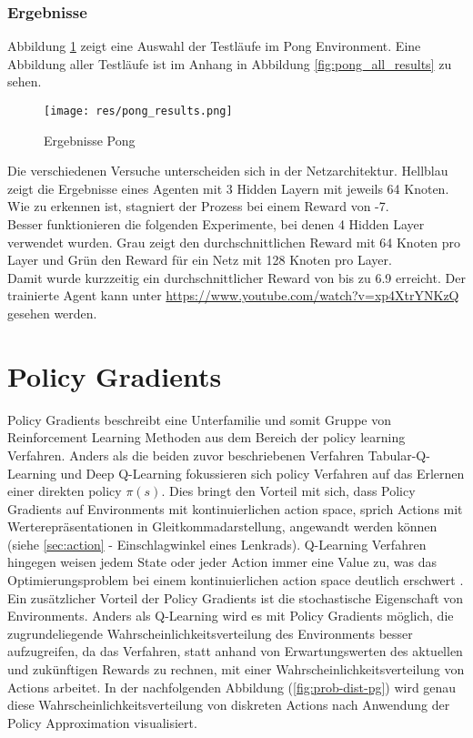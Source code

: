 \documentclass[11pt]{scrartcl}
\begin{document}
\subsubsection{Ergebnisse}
Abbildung \ref{fig:pong_results} zeigt eine Auswahl der Testläufe im Pong Environment.
Eine Abbildung aller Testläufe ist im Anhang in Abbildung \ref{fig:pong_all_results} zu
sehen.

\begin{figure}[htp]
\centering
\texttt{[image: res/pong\_results.png]}
\caption{Ergebnisse Pong}
\label{fig:pong_results}
\end{figure}
\noindent
Die verschiedenen Versuche unterscheiden sich in der Netzarchitektur. Hellblau zeigt die
Ergebnisse eines Agenten mit 3 Hidden Layern mit jeweils 64 Knoten. Wie zu erkennen ist,
stagniert der Prozess bei einem Reward von -7.\\
Besser funktionieren die folgenden Experimente, bei denen 4 Hidden Layer verwendet wurden.
Grau zeigt den durchschnittlichen Reward mit 64 Knoten pro Layer und Grün den Reward für
ein Netz mit 128 Knoten pro Layer.\\
Damit wurde kurzzeitig ein durchschnittlicher Reward von bis zu 6.9 erreicht. Der
trainierte Agent kann unter \url{https://www.youtube.com/watch?v=xp4XtrYNKzQ} gesehen
werden.

\newpage
\section{Policy Gradients}
Policy Gradients beschreibt eine Unterfamilie und somit Gruppe von Reinforcement Learning 
Methoden aus dem Bereich der policy learning Verfahren. Anders als die beiden zuvor
beschriebenen Verfahren Tabular-Q-Learning und Deep Q-Learning fokussieren sich policy
Verfahren auf das Erlernen einer direkten policy $\pi(s)$. Dies bringt den Vorteil mit sich,
dass Policy Gradients auf Environments mit kontinuierlichen action space, sprich Actions mit
Werterepräsentationen in Gleitkommadarstellung, angewandt werden können (siehe
\ref{sec:action}  - Einschlagwinkel eines Lenkrads). Q-Learning Verfahren
hingegen weisen jedem State oder jeder Action immer eine Value zu, was das Optimierungsproblem
bei einem kontinuierlichen action space deutlich erschwert \cite[~S.242]{L2018}. Ein
zusätzlicher Vorteil der Policy Gradients ist die stochastische Eigenschaft von Environments.
Anders als Q-Learning wird es mit Policy Gradients möglich, die zugrundeliegende
Wahrscheinlichkeitsverteilung des Environments besser aufzugreifen, da das Verfahren, statt
anhand von Erwartungswerten des aktuellen und zukünftigen Rewards zu rechnen, mit einer
Wahrscheinlichkeitsverteilung von Actions arbeitet. In der nachfolgenden Abbildung 
(\ref{fig:prob-dist-pg}) wird genau diese Wahrscheinlichkeitsverteilung von diskreten Actions
nach Anwendung der Policy Approximation visualisiert.
\end{document}
